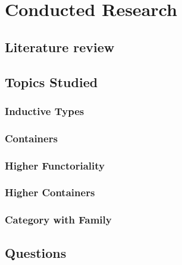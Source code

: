 \chapter{Conducted Research}

\section{Literature review}

\section{Topics Studied}

\subsection{Inductive Types}

\subsection{Containers}

\subsection{Higher Functoriality}

\subsection{Higher Containers}

\subsection{Category with Family}

\section{Questions}
